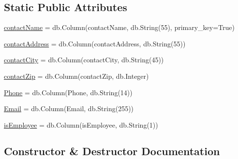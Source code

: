 \subsection*{Static Public Attributes}
\begin{DoxyCompactItemize}
\item 
\hyperlink{class_web_content_1_1classes_1_1contacts_af5b7ebdde96128f644dba2c9003395e1}{contact\+Name} = db.\+Column(\textquotesingle{}contact\+Name\textquotesingle{}, db.\+String(55), primary\+\_\+key=True)
\item 
\hyperlink{class_web_content_1_1classes_1_1contacts_aa2f4eaf4a9e2620d3f9cf92d359cb68e}{contact\+Address} = db.\+Column(\textquotesingle{}contact\+Address\textquotesingle{}, db.\+String(55))
\item 
\hyperlink{class_web_content_1_1classes_1_1contacts_ab337e819e9708c4385d88e19e5b4272a}{contact\+City} = db.\+Column(\textquotesingle{}contact\+City\textquotesingle{}, db.\+String(45))
\item 
\hyperlink{class_web_content_1_1classes_1_1contacts_aff779f52e8d69185e09157ab38bbeef2}{contact\+Zip} = db.\+Column(\textquotesingle{}contact\+Zip\textquotesingle{}, db.\+Integer)
\item 
\hyperlink{class_web_content_1_1classes_1_1contacts_aa4c26f3a90e573a3d5495dd9fea09067}{Phone} = db.\+Column(\textquotesingle{}Phone\textquotesingle{}, db.\+String(14))
\item 
\hyperlink{class_web_content_1_1classes_1_1contacts_af308c0c25a34db25695da939142548da}{Email} = db.\+Column(\textquotesingle{}Email\textquotesingle{}, db.\+String(255))
\item 
\hyperlink{class_web_content_1_1classes_1_1contacts_a6ef2db0009b3b8b0facfaf88d54b84e1}{is\+Employee} = db.\+Column(\textquotesingle{}is\+Employee\textquotesingle{}, db.\+String(1))
\end{DoxyCompactItemize}


\subsection{Constructor \& Destructor Documentation}
\mbox{\label{class_web_content_1_1classes_1_1contacts_a867bb2313c6cc01e6d3fa6936257f70c}} 
